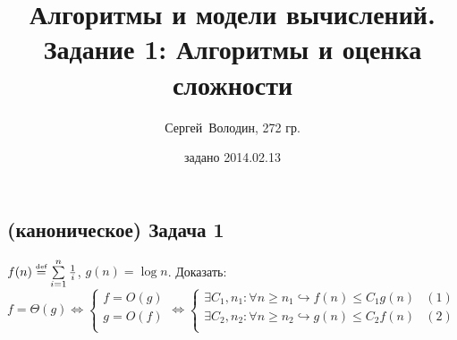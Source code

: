 \documentclass[a4paper]{article}
\title{Алгоритмы и модели вычислений.\\Задание 1: Алгоритмы и оценка сложности}
\date{задано 2014.02.13}
\author{Сергей~Володин, 272 гр.}
\def\eqdef{\overset{\mbox{\tiny def}}{=}}
\begin{document}
\maketitle
\subsection*{(каноническое) Задача 1}
$f(n) \eqdef \sum\limits_{i=1}^n\frac{1}{i}$, $g(n)=\log n$. Доказать: $f=\Theta(g)\Leftrightarrow \begin{cases}
f=O(g)\\
g=O(f)\\
\end{cases}\Leftrightarrow \begin{cases}
\exists C_1,n_1\colon\forall n\geqslant n_1\hookrightarrow f(n)\leqslant C_1 g(n) & (1)\\
\exists C_2,n_2\colon\forall n\geqslant n_2\hookrightarrow g(n)\leqslant C_2 f(n) & (2)\\
\end{cases}$
\end{document}
